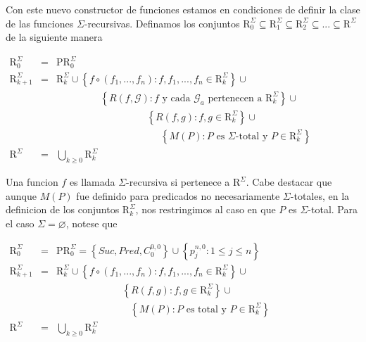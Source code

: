 Con este nuevo constructor de funciones estamos en condiciones de definir la clase de las funciones \(\Sigma \)-recursivas. Definamos los conjuntos \( \mathrm{R}_{0}^{\Sigma }\subseteq \mathrm{R}_{1}^{\Sigma }\subseteq \mathrm{R }_{2}^{\Sigma }\subseteq ...\subseteq \mathrm{R}^{\Sigma }\) de la siguiente manera

\(\displaystyle \begin{array}{lll} \mathrm{R}_{0}^{\Sigma } & = & \mathrm{PR}_{0}^{\Sigma } \\ \mathrm{R}_{k+1}^{\Sigma } & = & \mathrm{R}_{k}^{\Sigma }\cup \left\{ f\circ (f_{1},...,f_{n}):f,f_{1},...,f_{n}\in \mathrm{R}_{k}^{\Sigma }\right\} \cup \\ & & \;\;\;\;\;\;\;\;\;\;\;\;\;\;\;\;\left\{ R(f,\mathcal{G}):f\text{ y cada }\mathcal{G}_{a}\text{ pertenecen a }\mathrm{R}_{k}^{\Sigma }\right\} \cup \\ & & \;\;\;\;\;\;\;\;\;\;\;\;\;\;\;\;\;\;\;\;\;\;\;\;\;\;\;\;\;\;\;\;\;\left \{ R(f,g):f,g\in \mathrm{R}_{k}^{\Sigma }\right\} \cup \\ & & \;\;\;\;\;\;\;\;\;\;\;\;\;\;\;\;\;\;\;\;\;\;\;\;\;\;\;\;\;\;\;\;\;\;\; \;\;\;\left\{ M(P):P\text{ es }\Sigma \text{-total y }P\in \mathrm{R} _{k}^{\Sigma }\right\} \\ \mathrm{R}^{\Sigma } & = & \bigcup_{k\geq 0}\mathrm{R}_{k}^{\Sigma } \end{array} \)

Una funcion \(f\) es llamada \(\Sigma \)-recursiva si pertenece a \( \mathrm{R}^{\Sigma }\). Cabe destacar que aunque \(M(P)\) fue definido para predicados no necesariamente \(\Sigma \)-totales, en la definicion de los conjuntos \(\mathrm{R}_{k}^{\Sigma }\), nos restringimos al caso en que \(P\) es \(\Sigma \)-total.
Para el caso \(\Sigma =\varnothing \), notese que

\(\displaystyle \begin{array}{lll} \mathrm{R}_{0}^{\Sigma } & = & \mathrm{PR}_{0}^{\Sigma }=\left\{ Suc,Pred,C_{0}^{0,0}\right\} \cup \left\{ p_{j}^{n,0}:1\leq j\leq n\right\} \\ \mathrm{R}_{k+1}^{\Sigma } & = & \mathrm{R}_{k}^{\Sigma }\cup \left\{ f\circ (f_{1},...,f_{n}):f,f_{1},...,f_{n}\in \mathrm{R}_{k}^{\Sigma }\right\} \cup \\ & & \;\;\;\;\;\;\;\;\;\;\;\;\;\;\;\;\;\;\;\;\;\;\;\;\left\{ R(f,g):f,g\in \mathrm{R}_{k}^{\Sigma }\right\} \cup \\ & & \;\;\;\;\;\;\;\;\;\;\;\;\;\;\;\;\;\;\;\;\;\;\;\;\;\;\;\left\{ M(P):P \text{ es total y }P\in \mathrm{R}_{k}^{\Sigma }\right\} \\ \mathrm{R}^{\Sigma } & = & \bigcup_{k\geq 0}\mathrm{R}_{k}^{\Sigma } \end{array} \)


